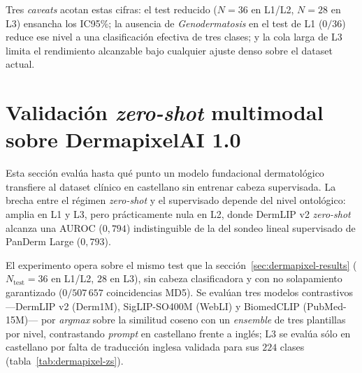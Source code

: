 Tres \emph{caveats} acotan estas cifras: el test reducido ($N = 36$
en L1/L2, $N = 28$ en L3) ensancha los IC95\%; la ausencia de
\emph{Genodermatosis} en el test de L1 ($0 / 36$) reduce ese nivel a
una clasificación efectiva de tres clases; y la cola larga de L3
limita el rendimiento alcanzable bajo cualquier ajuste denso sobre el
dataset actual.

\section{Validación \emph{zero-shot} multimodal sobre DermapixelAI 1.0}
\label{sec:dermapixel-zs}

Esta sección evalúa hasta qué punto un modelo fundacional
dermatológico transfiere al dataset clínico en castellano sin entrenar
cabeza supervisada. La brecha entre el régimen \emph{zero-shot} y el
supervisado depende del nivel ontológico: amplia en L1 y L3, pero
prácticamente nula en L2, donde DermLIP v2 \emph{zero-shot} alcanza
una AUROC ($0{,}794$) indistinguible de la del sondeo lineal
supervisado de PanDerm Large ($0{,}793$).

El experimento opera sobre el mismo test que la
sección~\ref{sec:dermapixel-results} ($N_{\mathrm{test}} = 36$ en
L1/L2, $28$ en L3), sin cabeza clasificadora y con no solapamiento
garantizado ($0 / 507\,657$ coincidencias MD5). Se evalúan tres
modelos contrastivos ---DermLIP v2 (Derm1M), SigLIP-SO400M (WebLI) y
BiomedCLIP (PubMed-15M)--- por \emph{argmax} sobre la similitud coseno
con un \emph{ensemble} de tres plantillas por nivel, contrastando
\emph{prompt} en castellano frente a inglés; L3 se evalúa sólo en
castellano por falta de traducción inglesa validada para sus $224$
clases (tabla~\ref{tab:dermapixel-zs}).

